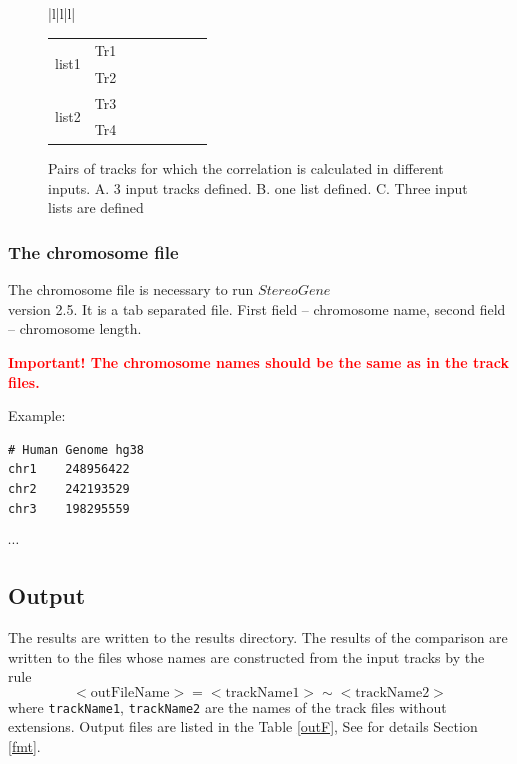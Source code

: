 \documentclass{article}
\newcommand{\tw}{\textwidth}
\newcommand{\red}{\textcolor{red}}
\newcommand{\sg}{$StereoGene$\\ version 2.5}
\begin{document}
\begin{figure}[!h]
\begin{tabular}{|l|l|l|}
\begin{minipage}{0.42\tw}
\begin{tabular}{ll|ll|ll|ll}
\multirow{2}{*}{\begin{sideways} list1 \end{sideways}}
&Tr1&\cellcolor{gray}&\cellcolor{gray}&\cor &\cor & \cor & \cor\\
&Tr2&\cellcolor{gray}&\cellcolor{gray}&\cor &\cor &\cor &\cor\\\hline

\multirow{2}{*}{\begin{sideways} list2 \end{sideways}}
&Tr3&\cellcolor{gray}&\cellcolor{gray}&\cellcolor{gray}&\cellcolor{gray}&\cor &\cor \\
&Tr4&\cellcolor{gray}&\cellcolor{gray}&\cellcolor{gray}&\cellcolor{gray}&\cor &\cor \\
\end{tabular}
\end{minipage}
\end{tabular}
\caption{Pairs of tracks for which the correlation is calculated in different inputs. A. 3 input tracks defined. B. one list defined. C. Three input lists are defined}\label{trackPairs}
\end{figure}

\subsubsection{The chromosome file}
The chromosome file is necessary to run \sg. It is a tab separated file. First field -- chromosome name, second field -- chromosome length. 

\red{\textbf{Important! The chromosome names should be the same as in the track files.}}

Example:

\begin{minipage}{0.3\tw}
\begin{shaded}
\begin{verbatim}
# Human Genome hg38
chr1	248956422
chr2	242193529
chr3	198295559
\end{verbatim}
$\cdots$
\end{shaded}
\end{minipage}



\subsection{Output}
The results are written to the results directory. The results of the comparison are written to the files whose names are constructed from the input tracks by the rule
$$
<\text{outFileName}>=<\text{trackName1}>\sim <\text{trackName2}>
$$
where \texttt{trackName1}, \texttt{trackName2} are the names of the track files without extensions. Output files are listed in the Table \ref{outF}, See for details Section \ref{fmt}.
\end{document}
